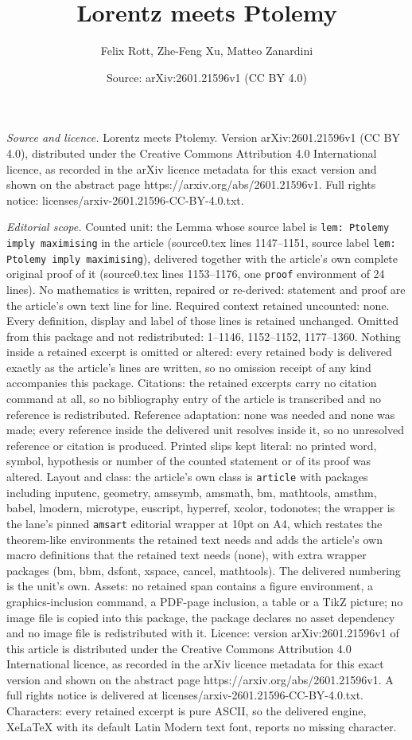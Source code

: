 \documentclass[10pt,a4paper]{amsart}
\title[Lorentz meets Ptolemy]{Lorentz meets Ptolemy}
\author{Felix Rott, Zhe-Feng Xu, Matteo Zanardini}
\date{Source: arXiv:2601.21596v1 (CC BY 4.0)}
\begin{document}
\maketitle

\noindent\emph{Source and licence.} Lorentz meets Ptolemy. Version arXiv:2601.21596v1 (CC BY 4.0), distributed under the Creative Commons Attribution 4.0 International licence, as recorded in the arXiv licence metadata for this exact version and shown on the abstract page https://arxiv.org/abs/2601.21596v1. Full rights notice: licenses/arxiv-2601.21596-CC-BY-4.0.txt.\par\smallskip

\noindent\textit{Editorial scope.} Counted unit: the Lemma whose source label is \texttt{lem: Ptolemy imply maximising} in the article (source0.tex lines 1147--1151, source label \texttt{lem: Ptolemy imply maximising}), delivered together with the article's own complete original proof of it (source0.tex lines 1153--1176, one \texttt{proof} environment of 24 lines). No mathematics is written, repaired or re-derived: statement and proof are the article's own text line for line. Required context retained uncounted: none. Every definition, display and label of those lines is retained unchanged. Omitted from this package and not redistributed: 1--1146, 1152--1152, 1177--1360. Nothing inside a retained excerpt is omitted or altered: every retained body is delivered exactly as the article's lines are written, so no omission receipt of any kind accompanies this package. Citations: the retained excerpts carry no citation command at all, so no bibliography entry of the article is transcribed and no reference is redistributed. Reference adaptation: none was needed and none was made; every reference inside the delivered unit resolves inside it, so no unresolved reference or citation is produced. Printed slips kept literal: no printed word, symbol, hypothesis or number of the counted statement or of its proof was altered. Layout and class: the article's own class is \texttt{article} with packages including inputenc, geometry, amssymb, amsmath, bm, mathtools, amsthm, babel, lmodern, microtype, euscript, hyperref, xcolor, todonotes; the wrapper is the lane's pinned \texttt{amsart} editorial wrapper at 10pt on A4, which restates the theorem-like environments the retained text needs and adds the article's own macro definitions that the retained text needs (none), with extra wrapper packages (bm, bbm, dsfont, xspace, cancel, mathtools). The delivered numbering is the unit's own. Assets: no retained span contains a figure environment, a graphics-inclusion command, a PDF-page inclusion, a table or a TikZ picture; no image file is copied into this package, the package declares no asset dependency and no image file is redistributed with it. Licence: version arXiv:2601.21596v1 of this article is distributed under the Creative Commons Attribution 4.0 International licence, as recorded in the arXiv licence metadata for this exact version and shown on the abstract page https://arxiv.org/abs/2601.21596v1. A full rights notice is delivered at licenses/arxiv-2601.21596-CC-BY-4.0.txt. Characters: every retained excerpt is pure ASCII, so the delivered engine, XeLaTeX with its default Latin Modern text font, reports no missing character.
\end{document}
